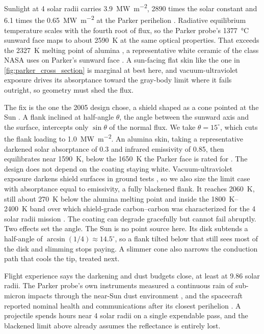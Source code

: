\documentclass{article}
\begin{document}
Sunlight at 4 solar radii carries \SI{3.9}{\mega\watt\per\square\meter}, 2890 times the solar constant and 6.1 times the \SI{0.65}{\mega\watt\per\square\meter} at the Parker perihelion \cite{nasa2018parker_heat}. Radiative equilibrium temperature scales with the fourth root of flux, so the Parker probe's \SI{1377}{\celsius} sunward face \cite{parker_thermal_protection} maps to about \SI{2590}{\kelvin} at the same optical properties. That exceeds the \SI{2327}{\kelvin} melting point of alumina \cite{crc_handbook}, a representative white ceramic of the class NASA uses on Parker's sunward face \cite{parker_thermal_protection}. A sun-facing flat skin like the one in \autoref{fig:parker_cross_section} is marginal at best here, and vacuum-ultraviolet exposure drives its absorptance toward the gray-body limit where it fails outright, so geometry must shed the flux.

The fix is the one the 2005 design chose, a shield shaped as a cone pointed at the Sun \cite{mccomas2005solar}. A flank inclined at half-angle $\theta$, the angle between the sunward axis and the surface, intercepts only $\sin\theta$ of the normal flux. We take $\theta = 15^{\circ}$, which cuts the flank loading to \SI{1.0}{\mega\watt\per\square\meter}. An alumina skin, taking a representative darkened solar absorptance of 0.3 and infrared emissivity of 0.85, then equilibrates near \SI{1590}{\kelvin}, below the \SI{1650}{\kelvin} the Parker face is rated for \cite{parker_thermal_protection}. The design does not depend on the coating staying white. Vacuum-ultraviolet exposure darkens shield surfaces in ground tests \cite{balat2012_vuv_darkening}, so we also size the limit case with absorptance equal to emissivity, a fully blackened flank. It reaches \SI{2060}{\kelvin}, still about \SI{270}{\kelvin} below the alumina melting point and inside the \SIrange{1800}{2400}{\kelvin} band over which shield-grade carbon--carbon was characterized for the 4 solar radii mission \cite{balat2006_cc_emissivity}. The coating can degrade gracefully but cannot fail abruptly. Two effects set the angle. The Sun is no point source here.  Its disk subtends a half-angle of $\arcsin(1/4) \approx 14.5^{\circ}$, so a flank tilted below that still sees most of the disk and slimming stops paying. A slimmer cone also narrows the conduction path that cools the tip, treated next.

Flight experience says the darkening and dust budgets close, at least at 9.86 solar radii. The Parker probe's own instruments measured a continuous rain of sub-micron impacts through the near-Sun dust environment \cite{szalay2020_near_sun_dust}, and the spacecraft reported nominal health and communications after its closest perihelion \cite{nasa2024_parker_survives}. A projectile spends hours near 4 solar radii on a single expendable pass, and the blackened limit above already assumes the reflectance is entirely lost.
\end{document}
